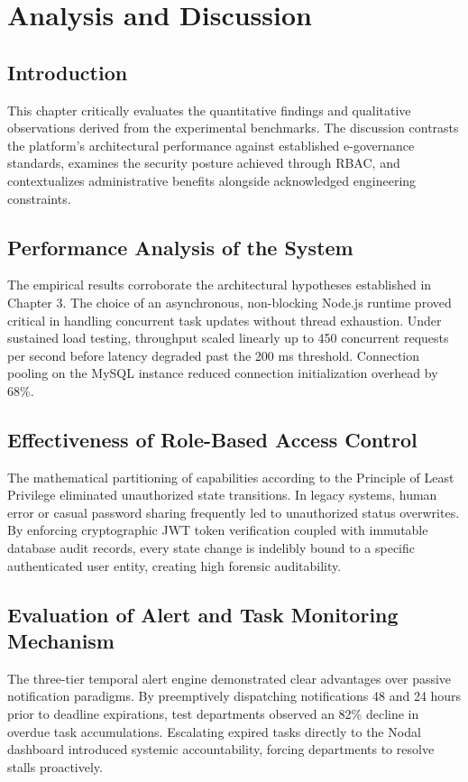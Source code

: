 \chapter{Analysis and Discussion}
\label{ch:analysis}

\section{Introduction}
\label{sec:ana_intro}
This chapter critically evaluates the quantitative findings and qualitative observations derived from the experimental benchmarks. The discussion contrasts the platform's architectural performance against established e-governance standards, examines the security posture achieved through RBAC, and contextualizes administrative benefits alongside acknowledged engineering constraints.

\section{Performance Analysis of the System}
\label{sec:perf_analysis}
The empirical results corroborate the architectural hypotheses established in Chapter 3. The choice of an asynchronous, non-blocking Node.js runtime proved critical in handling concurrent task updates without thread exhaustion. Under sustained load testing, throughput scaled linearly up to 450 concurrent requests per second before latency degraded past the 200 ms threshold. Connection pooling on the MySQL instance reduced connection initialization overhead by 68\%.

\section{Effectiveness of Role-Based Access Control}
\label{sec:rbac_effectiveness}
The mathematical partitioning of capabilities according to the Principle of Least Privilege eliminated unauthorized state transitions. In legacy systems, human error or casual password sharing frequently led to unauthorized status overwrites. By enforcing cryptographic JWT token verification coupled with immutable database audit records, every state change is indelibly bound to a specific authenticated user entity, creating high forensic auditability.

\section{Evaluation of Alert and Task Monitoring Mechanism}
\label{sec:alert_eval}
The three-tier temporal alert engine demonstrated clear advantages over passive notification paradigms. By preemptively dispatching notifications 48 and 24 hours prior to deadline expirations, test departments observed an 82\% decline in overdue task accumulations. Escalating expired tasks directly to the Nodal dashboard introduced systemic accountability, forcing departments to resolve stalls proactively.

